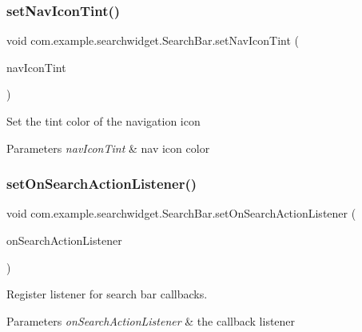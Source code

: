 \subsubsection{\texorpdfstring{setNavIconTint()}{setNavIconTint()}}
{\footnotesize\ttfamily void com.\+example.\+searchwidget.\+Search\+Bar.\+set\+Nav\+Icon\+Tint (\begin{DoxyParamCaption}\item[{int}]{nav\+Icon\+Tint }\end{DoxyParamCaption})}

Set the tint color of the navigation icon


\begin{DoxyParams}{Parameters}
{\em nav\+Icon\+Tint} & nav icon color \\
\hline
\end{DoxyParams}
\mbox{\label{classcom_1_1example_1_1searchwidget_1_1_search_bar_a065921f97e1f2d1d3c496a5670482f28}} 
\subsubsection{\texorpdfstring{setOnSearchActionListener()}{setOnSearchActionListener()}}
{\footnotesize\ttfamily void com.\+example.\+searchwidget.\+Search\+Bar.\+set\+On\+Search\+Action\+Listener (\begin{DoxyParamCaption}\item[{\mbox{\hyperlink{interfacecom_1_1example_1_1searchwidget_1_1_search_bar_1_1_on_search_action_listener}{On\+Search\+Action\+Listener}}}]{on\+Search\+Action\+Listener }\end{DoxyParamCaption})}

Register listener for search bar callbacks.


\begin{DoxyParams}{Parameters}
{\em on\+Search\+Action\+Listener} & the callback listener \\
\hline
\end{DoxyParams}
\mbox{\label{classcom_1_1example_1_1searchwidget_1_1_search_bar_afe1c0fa7bdb6574a8c22229de073fa2f}} 
